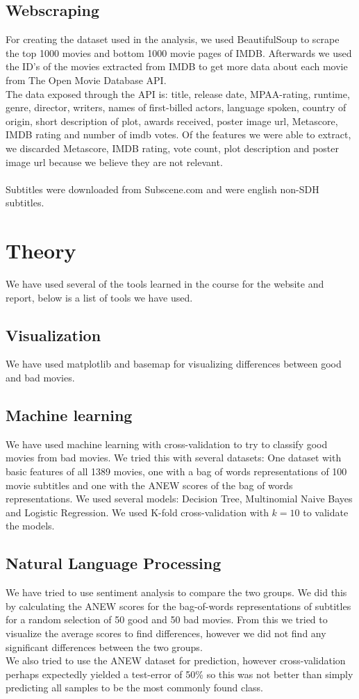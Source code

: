 \documentclass{acm_proc_article-sp}
\begin{document}
\subsection{Webscraping}
For creating the dataset used in the analysis, we used BeautifulSoup\cite{BS4} to scrape the top 1000 movies and bottom 1000 movie pages of IMDB\cite{IMDB}. Afterwards we used the ID's of the movies extracted from IMDB to get more data about each movie from The Open Movie Database API\cite{OMDB}.\\ The data exposed through the API is: title, release date, MPAA-rating, runtime, genre, director, writers, names of first-billed actors, language spoken, country of origin, short description of plot, awards received, poster image url, Metascore, IMDB rating and number of imdb votes.
Of the features we were able to extract, we discarded Metascore, IMDB rating, vote count, plot description and poster image url because we believe they are not relevant.\\\\
Subtitles were downloaded from Subscene.com\cite{subscene} and were english non-SDH subtitles.

\section{Theory}
We have used several of the tools learned in the course for the website and report, below is a list of tools we have used.
\subsection{Visualization}
We have used matplotlib and basemap for visualizing differences between good and bad movies. 
\subsection{Machine learning}
We have used machine learning with cross-validation to try to classify good movies from bad movies. We tried this with several datasets: One dataset with basic features of all 1389 movies, one with a bag of words representations of 100 movie subtitles and one with the ANEW scores of the bag of words representations. We used several models: Decision Tree, Multinomial Naive Bayes and Logistic Regression. We used K-fold cross-validation with $k=10$ to validate the models.

\subsection{Natural Language Processing}
We have tried to use sentiment analysis to compare the two groups. We did this by calculating the ANEW scores\cite{anew} for the bag-of-words representations of subtitles for a random selection of 50 good and 50 bad movies. From this we tried to visualize the average scores to find differences, however we did not find any significant differences between the two groups.\\
We also tried to use the ANEW dataset for prediction, however cross-validation perhaps expectedly yielded a test-error of 50\% so this was not better than simply predicting all samples to be the most commonly found class. \\
\end{document}
